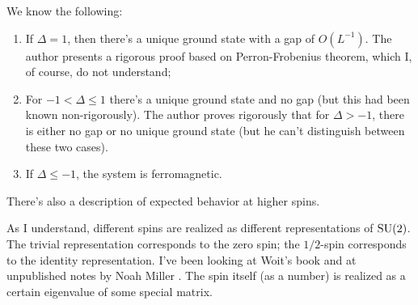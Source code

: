 	We know the following:
	\begin{enumerate}
	\item If $\Delta = 1$, then there's a unique ground state with a gap of $O(L^{-1})$. The author presents a rigorous proof based on Perron-Frobenius theorem, which I, of course, do not understand;
	\item For $-1 < \Delta \leq 1$ there's a unique ground state and no gap (but this had been known non-rigorously). The author proves rigorously that for $\Delta > -1$, there is either no gap or no unique ground state (but he can't distinguish between these two cases).
	\item If $\Delta \leq -1$, the system is ferromagnetic.
	\end{enumerate}
	There's also a description of expected behavior at higher spins. 
	\begin{fur}
As I understand, different spins are realized as different representations of $\operatorname{SU}(2)$. The trivial representation corresponds to the zero spin; the $1/2$-spin corresponds to the identity representation. I've been looking at Woit's book \cite{woit} and at unpublished notes by Noah Miller \cite{miller}. The spin itself (as a number) is realized as a certain eigenvalue of some special matrix.
	\end{fur}